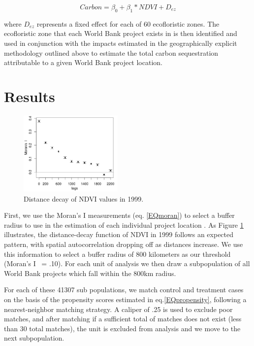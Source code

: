 \documentclass{article}\usepackage[]{graphicx}\usepackage[]{color}
\newenvironment{knitrout}{}{}  %
\begin{document}
\begin{knitrout}
\begin{equation}
Carbon = \beta_{0} + \beta_{1} * NDVI + D_{ez}
\label{EQcarb}
\end{equation}

where \begin{math}D_{ez}\end{math} represents a fixed effect for each of 60 ecofloristic zones.  The ecofloristic zone that each World Bank project exists in is then identified and used in conjunction with the impacts estimated in the geographically explicit methodology outlined above to estimate the total carbon sequestration attributable to a given World Bank project location.

\newpage
\section{Results}

\begin{figure}
\centering
 \includegraphics[width=0.45\textwidth]{pre_avg_NDVI_max_full}
\caption{Distance decay of NDVI values in 1999.}
  \label{DDFig}
\end{figure}


First, we use the Moran's I measurements (eq. \ref{EQmoran}) to select a buffer radius to use in the estimation of each individual project location .
As Figure \ref{DDFig} illustrates, the distance-decay function of NDVI in 1999 follows an expected pattern, with spatial autocorrelation dropping off as distances increase.  
We use this information to select a buffer radius of 800 kilometers as our threshold (Moran's I ~= .10).  
For each unit of analysis we then draw a subpopulation of all World Bank projects which fall within the 800km radius.
\par
For each of these 41307 sub populations, we match control and treatment cases on the basis of the propensity scores estimated in eq.\ref{EQpropensity}, following a nearest-neighbor matching strategy.  
A caliper of .25 is used to exclude poor matches, and after matching if a sufficient total of matches does not exist (less than 30 total matches), the unit is excluded from analysis and we move to the next subpopulation.  
\par


\end{knitrout}
\end{document}
